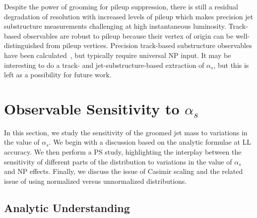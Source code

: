 \documentclass[11pt]{cernrep}
\begin{document}
Despite the power of grooming for pileup suppression, there is still a residual degradation of resolution with increased levels of pileup which makes precision jet substructure measurements challenging at high instantaneous luminosity.
%
Track-based observables are robust to pileup because their vertex of origin can be well-distinguished from pileup vertices.
%
Precision track-based substructure observables have been calculated~\cite{Krohn:2012fg,Waalewijn:2012sv,Chang:2013rca,Elder:2017bkd}, but typically require universal NP input.
%
It may be interesting to do a track- and jet-substructure-based extraction of $\alpha_s$, but this is left as a possibility for future work.

\section{Observable Sensitivity to $\alpha_s$}
\label{jetsub_alphas_sec:jetmass}

In this section, we study the sensitivity of the groomed jet mass to variations in the value of $\alpha_s$.
%
We begin with a discussion based on the analytic formulae at LL accuracy.
%
We then perform a PS study, highlighting the interplay between the sensitivity of different parts of the distribution to variations in the value of $\alpha_s$ and NP effects.
%
Finally, we discuss the issue of Casimir scaling and the related issue of using normalized versus unnormalized distributions.


\subsection{Analytic Understanding}
\label{jetsub_alphas_sec:analytic}
\end{document}
